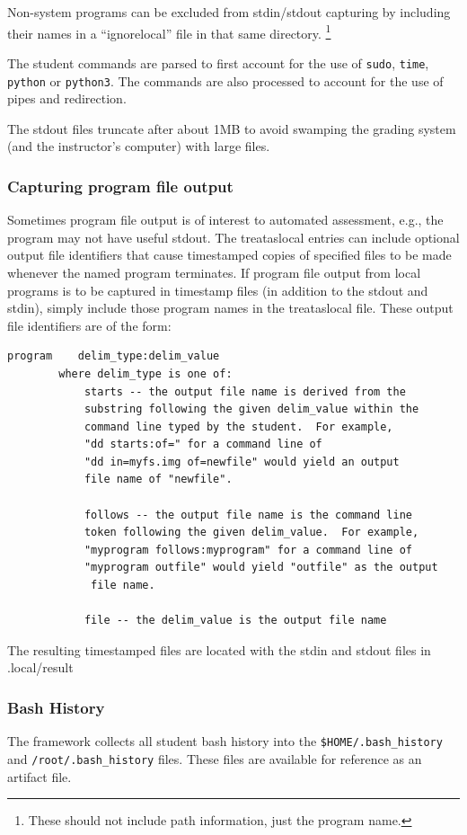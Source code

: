 \documentclass[12pt]{article}
\begin{document}
Non-system programs can be excluded from stdin/stdout capturing by including their names in
a ``ignorelocal'' file in that same directory.  \footnote{These should not include path information, just the program name.}

The student commands are parsed to first account for the use of {\tt sudo}, {\tt time}, {\tt python} or {\tt python3}.
The commands are also processed to account for the use of pipes and redirection. 

The stdout files truncate after about 1MB to avoid swamping the grading system (and the instructor's computer) with large files.

\subsubsection{Capturing program file output}
\label{program output}
Sometimes program file output is of interest to automated assessment, e.g., the program
may not have useful stdout.
The treataslocal entries can include optional output file identifiers that
cause timestamped copies of specified files to be made whenever the named program terminates.
If program file output from local programs is to be captured in timestamp files (in addition
to the stdout and stdin), simply include those program names in the treataslocal file.
These output file identifiers are of the form:
\begin{verbatim}
program    delim_type:delim_value
        where delim_type is one of:
            starts -- the output file name is derived from the 
            substring following the given delim_value within the 
            command line typed by the student.  For example, 
            "dd starts:of=" for a command line of 
            "dd in=myfs.img of=newfile" would yield an output 
            file name of "newfile".
     
            follows -- the output file name is the command line 
            token following the given delim_value.  For example, 
            "myprogram follows:myprogram" for a command line of
            "myprogram outfile" would yield "outfile" as the output 
             file name.

            file -- the delim_value is the output file name
\end{verbatim}
\noindent The resulting timestamped files are located with the stdin and stdout files in .local/result

\subsubsection{Bash History}
The framework collects all student bash history into the \texttt{\$HOME/.bash\_history} and \newline
\texttt{/root/.bash\_history} files.  These files are
available for reference as an artifact file.  
\end{document}
